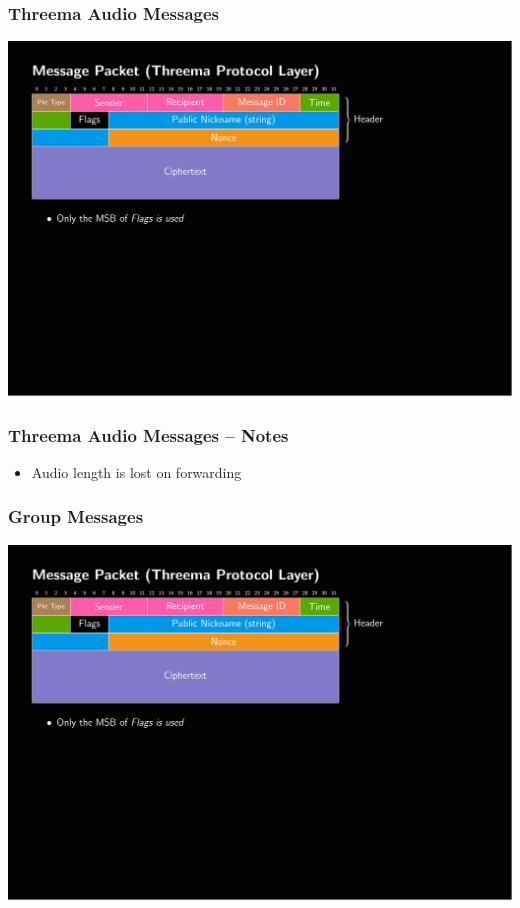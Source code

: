 \documentclass[
	aspectratio=169,
	xetex,
]{beamer}
\begin{document}
\begin{frame}
	\frametitle{Threema Audio Messages}
	\includegraphics[page=5,clip,trim={.99cm 7.5cm 3.2cm 1.8cm},width=\textwidth]{out/messages.pdf}
\end{frame}

\begin{frame}
	\frametitle{Threema Audio Messages -- Notes}
	\begin{itemize}
		\item Audio length is lost on forwarding
	\end{itemize}
\end{frame}

\begin{frame}
	\frametitle{Group Messages}
	\includegraphics[page=6,clip,trim={.99cm 7.5cm 3.2cm 1.8cm},width=\textwidth]{out/messages.pdf}
\end{frame}
\end{document}

